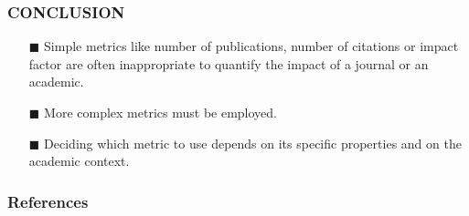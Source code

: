 \documentclass{beamer}
\begin{document}
\begin{frame}
    \frametitle{CONCLUSION}
    \begin{itemize}
        \item [$\blacksquare$] Simple metrics like number of publications, number of citations or impact factor are often inappropriate to quantify the impact of a journal or an academic.
        \item [$\blacksquare$] More complex metrics must be employed.
        \item [$\blacksquare$] Deciding which metric to use depends on its specific properties and on the academic context.
    \end{itemize}
\end{frame}

\begin{frame}[allowframebreaks]
    \frametitle{References}

    
    

\end{frame}
\end{document}
